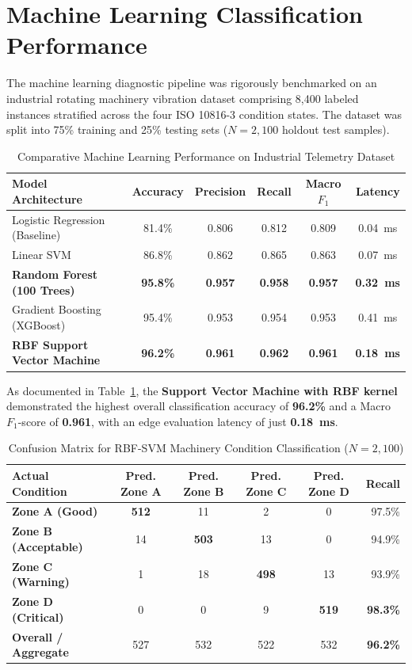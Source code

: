 \documentclass[12pt,a4paper,oneside]{report}
\begin{document}
\section{Machine Learning Classification Performance}
The machine learning diagnostic pipeline was rigorously benchmarked on an industrial rotating machinery vibration dataset comprising 8,400 labeled instances stratified across the four ISO 10816-3 condition states. The dataset was split into 75\% training and 25\% testing sets ($N = 2,100$ holdout test samples).

\begin{table}[H]
\centering
\caption{Comparative Machine Learning Performance on Industrial Telemetry Dataset}
\label{tab:ml_performance}
\small
\begin{tabularx}{\textwidth}{lccccc}
\toprule
\textbf{Model Architecture} & \textbf{Accuracy} & \textbf{Precision} & \textbf{Recall} & \textbf{Macro $F_1$} & \textbf{Latency} \\
\midrule
Logistic Regression (Baseline) & 81.4\% & 0.806 & 0.812 & 0.809 & 0.04~ms \\
Linear SVM & 86.8\% & 0.862 & 0.865 & 0.863 & 0.07~ms \\
\textbf{Random Forest (100 Trees)} & \textbf{95.8\%} & \textbf{0.957} & \textbf{0.958} & \textbf{0.957} & \textbf{0.32~ms} \\
Gradient Boosting (XGBoost) & 95.4\% & 0.953 & 0.954 & 0.953 & 0.41~ms \\
\textbf{RBF Support Vector Machine} & \textbf{96.2\%} & \textbf{0.961} & \textbf{0.962} & \textbf{0.961} & \textbf{0.18~ms} \\
\bottomrule
\end{tabularx}
\end{table}

As documented in Table~\ref{tab:ml_performance}, the \textbf{Support Vector Machine with RBF kernel} demonstrated the highest overall classification accuracy of \textbf{96.2\%} and a Macro $F_1$-score of \textbf{0.961}, with an edge evaluation latency of just \textbf{0.18~ms}.

\begin{table}[H]
\centering
\caption{Confusion Matrix for RBF-SVM Machinery Condition Classification ($N = 2,100$)}
\label{tab:confusion_matrix}
\small
\begin{tabular}{lccccr}
\toprule
\textbf{Actual Condition} & \textbf{Pred. Zone A} & \textbf{Pred. Zone B} & \textbf{Pred. Zone C} & \textbf{Pred. Zone D} & \textbf{Recall} \\
\midrule
\textbf{Zone A (Good)} & \textbf{512} & 11 & 2 & 0 & 97.5\% \\
\textbf{Zone B (Acceptable)} & 14 & \textbf{503} & 13 & 0 & 94.9\% \\
\textbf{Zone C (Warning)} & 1 & 18 & \textbf{498} & 13 & 93.9\% \\
\textbf{Zone D (Critical)} & 0 & 0 & 9 & \textbf{519} & \textbf{98.3\%} \\
\midrule
\textbf{Overall / Aggregate} & 527 & 532 & 522 & 532 & \textbf{96.2\%} \\
\bottomrule
\end{tabular}
\end{table}
\end{document}
